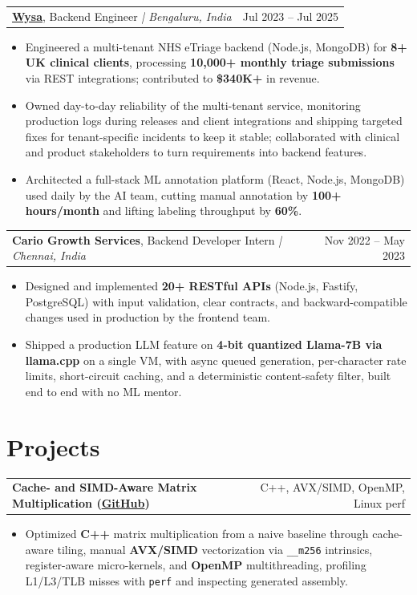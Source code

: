 \documentclass[letterpaper,11pt]{article}
\makeatletter
\newcommand{\expItem}[4]{%
  \vspace{2pt}
  \begin{tabular*}{\textwidth}{@{}l@{\extracolsep{\fill}}r@{}}
    \textbf{#1}, #2 \textit{| #3} & #4 \\
  \end{tabular*}\par\vspace{-3pt}
}
\newcommand{\projItem}[2]{%
  \vspace{2pt}
  \begin{tabular*}{\textwidth}{@{}l@{\extracolsep{\fill}}r@{}}
    \textbf{#1} & #2 \\
  \end{tabular*}\par\vspace{-3pt}
}
\makeatother
\begin{document}
\expItem{\href{https://www.wysa.io}{Wysa}}{Backend Engineer}{Bengaluru, India}{Jul 2023 -- Jul 2025}
\begin{itemize}
  \item Engineered a multi-tenant NHS eTriage backend (Node.js, MongoDB) for \textbf{8+ UK clinical clients}, processing \textbf{10{,}000+ monthly triage submissions} via REST integrations; contributed to \textbf{\$340K+} in revenue.
  \item Owned day-to-day reliability of the multi-tenant service, monitoring production logs during releases and client integrations and shipping targeted fixes for tenant-specific incidents to keep it stable; collaborated with clinical and product stakeholders to turn requirements into backend features.
  \item Architected a full-stack ML annotation platform (React, Node.js, MongoDB) used daily by the AI team, cutting manual annotation by \textbf{100+ hours/month} and lifting labeling throughput by \textbf{60\%}.
\end{itemize}

\expItem{Cario Growth Services}{Backend Developer Intern}{Chennai, India}{Nov 2022 -- May 2023}
\begin{itemize}
  \item Designed and implemented \textbf{20+ RESTful APIs} (Node.js, Fastify, PostgreSQL) with input validation, clear contracts, and backward-compatible changes used in production by the frontend team.
  \item Shipped a production LLM feature on \textbf{4-bit quantized Llama-7B via llama.cpp} on a single VM, with async queued generation, per-character rate limits, short-circuit caching, and a deterministic content-safety filter, built end to end with no ML mentor.
\end{itemize}

\section{Projects}

\projItem{Cache- and SIMD-Aware Matrix Multiplication {\normalfont\small(\href{https://github.com/Deva-1903/cs690pf}{GitHub})}}{C++, AVX/SIMD, OpenMP, Linux perf}
\begin{itemize}
  \item Optimized \textbf{C++} matrix multiplication from a naive baseline through cache-aware tiling, manual \textbf{AVX/SIMD} vectorization via \texttt{\_\_m256} intrinsics, register-aware micro-kernels, and \textbf{OpenMP} multithreading, profiling L1/L3/TLB misses with \texttt{perf} and inspecting generated assembly.
\end{itemize}
\end{document}
